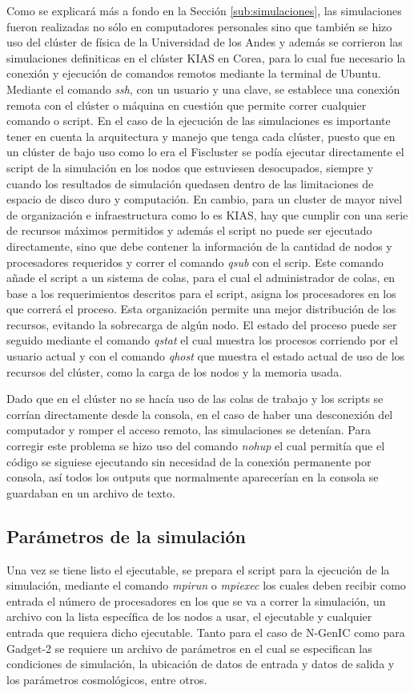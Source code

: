 Como se explicará más a fondo en la Sección \ref{sub:simulaciones}, las simulaciones fueron realizadas no sólo en computadores personales sino que también se hizo uso del clúster de física de la Universidad de los Andes y además se corrieron las simulaciones definiticas en el clúster KIAS en Corea, para lo cual fue necesario la conexión y ejecución de comandos remotos mediante la terminal de Ubuntu. Mediante el comando \textit{ssh}, con un usuario y una clave, se establece una conexión remota con el clúster o máquina en cuestión que permite correr cualquier comando o script. En el caso de la ejecución de las simulaciones es importante tener en cuenta la arquitectura y manejo que tenga cada clúster, puesto que en un clúster de bajo uso como lo era el Fiscluster se podía ejecutar directamente el script de la simulación en los nodos que estuviesen desocupados, siempre y cuando los resultados de simulación quedasen dentro de las limitaciones de espacio de disco duro y computación. En cambio, para un cluster de mayor nivel de organización e infraestructura como lo es KIAS, hay que cumplir con una serie de recursos máximos permitidos y además el script no puede ser ejecutado directamente, sino que debe contener la información de la cantidad de nodos y procesadores requeridos y correr el comando \textit{qsub} con el scrip. Este comando añade el script a un sistema de colas, para el cual el administrador de colas, en base a los requerimientos descritos para el script, asigna los procesadores en los que correrá el proceso. Esta organización permite una mejor distribución de los recursos, evitando la sobrecarga de algún nodo. El estado del proceso puede ser seguido mediante el comando \textit{qstat} el cual muestra los procesos corriendo por el usuario actual y con el comando \textit{qhost} que muestra el estado actual de uso de los recursos del clúster, como la carga de los nodos y la memoria usada. 

Dado que en el clúster no se hacía uso de las colas de trabajo y los scripts se corrían directamente desde la consola, en el caso de haber una desconexión del computador y romper el acceso remoto, las simulaciones se detenían. Para corregir este problema se hizo uso del comando \textit{nohup} el cual permitía que el código se siguiese ejecutando sin necesidad de la conexión permanente por consola, así todos los outputs que normalmente aparecerían en la consola se guardaban en un archivo de texto.

\subsection{Parámetros de la simulación}
Una vez se tiene listo el ejecutable, se prepara el script para la ejecución de la simulación, mediante el comando \textit{mpirun} o \textit{mpiexec} los cuales deben recibir como entrada el número de procesadores en los que se va a correr la simulación, un archivo con la lista específica de los nodos a usar, el ejecutable y cualquier entrada que requiera dicho ejecutable. Tanto para el caso de N-GenIC como para Gadget-2 se requiere un archivo de parámetros en el cual se especifican las condiciones de simulación, la ubicación de datos de entrada y datos de salida y los parámetros cosmológicos, entre otros. 

